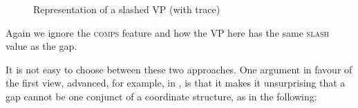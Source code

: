 \documentclass[output=paper
,notxmath 
 	        ,biblatex
                ,babelshorthands
                ,newtxmath
                ,draftmode
                ,colorlinks, citecolor=brown
]{langscibook}
\begin{document}
\begin{figure}
{}
    \caption{\label{fig:UDC:21}Representation of a slashed VP (with trace)}  
\end{figure}


\noindent
Again we ignore the \textsc{comps} feature and how the VP here has the same \textsc{slash}
value as the gap.

It is not easy to choose between these two approaches. One argument in
favour of the first view, advanced, for example, in \citet[Section~3.5.2]{Bouma:Malouf:Sag:01}, is that it makes it unsurprising that a gap cannot be one
conjunct of a coordinate structure, as in the following:

\begin{exe} \ex \begin{xlist} \label{ex:UDC:22}

\end{xlist}
\end{exe}
\end{document}
